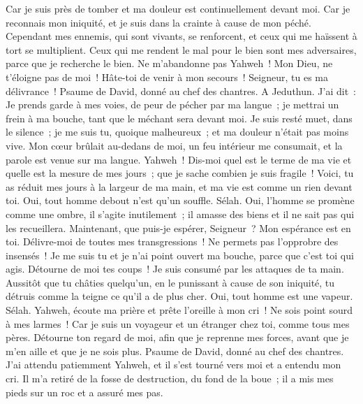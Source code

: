 \begin{multicols}{2}
Car je suis près de tomber et ma douleur est continuellement devant moi.
Car je reconnais mon iniquité, et je suis dans la crainte à cause de mon péché.
Cependant mes ennemis, qui sont vivants, se renforcent, et ceux qui me haïssent à tort se multiplient.
Ceux qui me rendent le mal pour le bien sont mes adversaires, parce que je recherche le bien.
Ne m'abandonne pas Yahweh~! Mon Dieu, ne t'éloigne pas de moi~!
Hâte-toi de venir à mon secours~! Seigneur, tu es ma délivrance~!
\VerseOne{}Psaume de David, donné au chef des chantres. A Jeduthun.
J'ai dit~: Je prends garde à mes voies, de peur de pécher par ma langue~; je mettrai un frein à ma bouche, tant que le méchant sera devant moi.
Je suis resté muet, dans le silence~; je me suis tu, quoique malheureux~; et ma douleur n'était pas moins vive.
Mon cœur brûlait au-dedans de moi, un feu intérieur me consumait, et la parole est venue sur ma langue.
Yahweh~! Dis-moi quel est le terme de ma vie et quelle est la mesure de mes jours~; que je sache combien je suis fragile~!
Voici, tu as réduit mes jours à la largeur de ma main, et ma vie est comme un rien devant toi. Oui, tout homme debout n'est qu'un souffle. Sélah.
Oui, l'homme se promène comme une ombre, il s'agite inutilement~; il amasse des biens et il ne sait pas qui les recueillera.
Maintenant, que puis-je espérer, Seigneur~? Mon espérance est en toi.
Délivre-moi de toutes mes transgressions~! Ne permets pas l'opprobre des insensés~!
Je me suis tu et je n'ai point ouvert ma bouche, parce que c'est toi qui agis.
Détourne de moi tes coups~! Je suis consumé par les attaques de ta main.
Aussitôt que tu châties quelqu'un, en le punissant à cause de son iniquité, tu détruis comme la teigne ce qu'il a de plus cher. Oui, tout homme est une vapeur. Sélah.
Yahweh, écoute ma prière et prête l'oreille à mon cri~! Ne sois point sourd à mes larmes~! Car je suis un voyageur et un étranger chez toi, comme tous mes pères.
Détourne ton regard de moi, afin que je reprenne mes forces, avant que je m'en aille et que je ne sois plus.
\VerseOne{}Psaume de David, donné au chef des chantres.
J'ai attendu patiemment Yahweh, et il s'est tourné vers moi et a entendu mon cri.
Il m'a retiré de la fosse de destruction, du fond de la boue~; il a mis mes pieds sur un roc et a assuré mes pas.

\end{multicols}
